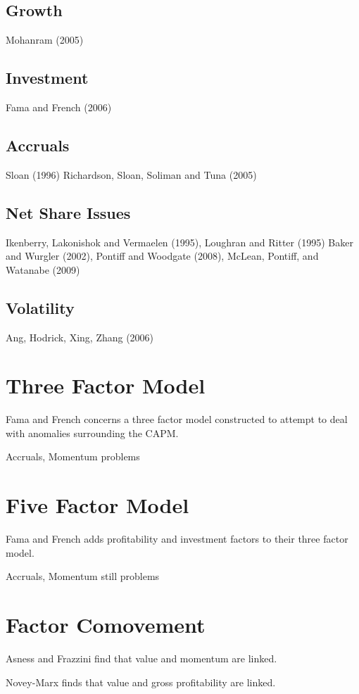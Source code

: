 \subsection{Growth}

Mohanram (2005)

\subsection{Investment}

Fama and French (2006)

\subsection{Accruals}

Sloan (1996)\cite{sloan1996stock}
Richardson, Sloan, Soliman and Tuna (2005)

\subsection{Net Share Issues}

Ikenberry, Lakonishok and Vermaelen (1995)\cite{ikenberry1995market},
Loughran and Ritter (1995)\cite{loughran1995new}
Baker and Wurgler (2002),
Pontiff and Woodgate (2008),
McLean, Pontiff, and Watanabe (2009)

\subsection{Volatility}

Ang, Hodrick, Xing, Zhang (2006)\cite{ang2006cross}

\section{Three Factor Model}

Fama and French\cite{fama1993common} concerns a three factor model constructed to attempt
to deal with anomalies surrounding the CAPM.

Accruals, Momentum problems

\section{Five Factor Model}

Fama and French\cite{fama2016dissecting} adds profitability and investment factors to
their three factor model.

Accruals, Momentum still problems

\section{Factor Comovement}

Asness and Frazzini\cite{asness2013devil} find that value and momentum are linked.

Novey-Marx\cite{novy2013other} finds that value and gross profitability are linked.
